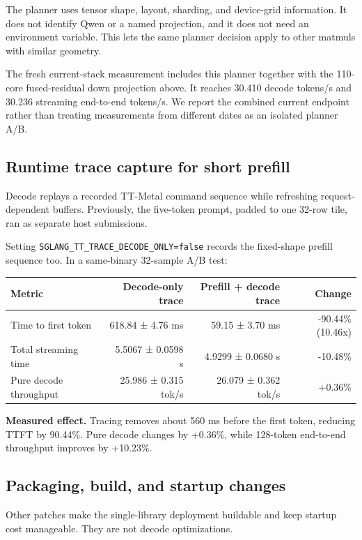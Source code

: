 \documentclass[
  10pt,
  american,
  10pt,
  letterpaper]{article}
\begin{document}
The planner uses tensor shape, layout, sharding, and device-grid
information. It does not identify Qwen or a named projection, and it
does not need an environment variable. This lets the same planner
decision apply to other matmuls with similar geometry.

The fresh current-stack measurement includes this planner together with
the 110-core fused-residual down projection above. It reaches 30.410
decode tokens/s and 30.236 streaming end-to-end tokens/s. We report the
combined current endpoint rather than treating measurements from
different dates as an isolated planner A/B.

\hypertarget{runtime-trace-capture-for-short-prefill}{%
\subsection{Runtime trace capture for short
prefill}\label{runtime-trace-capture-for-short-prefill}}

Decode replays a recorded TT-Metal command sequence while refreshing
request-dependent buffers. Previously, the five-token prompt, padded to
one 32-row tile, ran as separate host submissions.

Setting \texttt{SGLANG\_TT\_TRACE\_DECODE\_ONLY=false} records the
fixed-shape prefill sequence too. In a same-binary 32-sample A/B test:

\begin{longtable}[]{@{}lrrr@{}}
\toprule
Metric & Decode-only trace & Prefill + decode trace &
Change\tabularnewline
\midrule
\endhead
Time to first token & 618.84 ± 4.76 ms & 59.15 ± 3.70 ms & -90.44\%
(10.46x)\tabularnewline
Total streaming time & 5.5067 ± 0.0598 s & 4.9299 ± 0.0680 s &
-10.48\%\tabularnewline
Pure decode throughput & 25.986 ± 0.315 tok/s & 26.079 ± 0.362 tok/s &
+0.36\%\tabularnewline
\bottomrule
\end{longtable}

\textbf{Measured effect.} Tracing removes about 560 ms before the first
token, reducing TTFT by 90.44\%. Pure decode changes by +0.36\%, while
128-token end-to-end throughput improves by +10.23\%.

\hypertarget{packaging-build-and-startup-changes}{%
\subsection{Packaging, build, and startup
changes}\label{packaging-build-and-startup-changes}}

Other patches make the single-library deployment buildable and keep
startup cost manageable. They are not decode optimizations.
\end{document}
